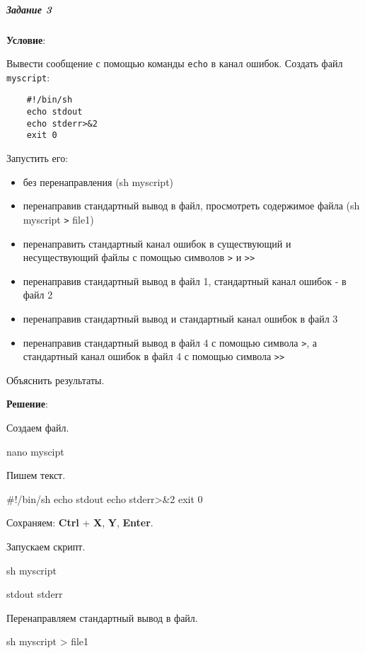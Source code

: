 \subparagraph{Задание 3} \textbf{Условие}:

Вывести сообщение с помощью команды \verb|echo| в канал ошибок.
Создать файл \verb|myscript|:

\begin{verbatim}
    #!/bin/sh
    echo stdout
    echo stderr>&2
    exit 0
\end{verbatim}

Запустить его:
\begin{itemize}
    \item без перенаправления (sh myscript)
    \item перенаправив стандартный вывод в файл, просмотреть содержимое файла (sh myscript \verb|>| file1)
    \item перенаправить стандартный канал ошибок в существующий и несуществующий файлы с помощью символов \verb|>| и \verb|>>|
    \item перенаправив стандартный вывод в файл 1, стандартный канал ошибок - в файл 2
    \item перенаправив стандартный вывод и стандартный канал ошибок в файл 3
    \item перенаправив стандартный вывод в файл 4 с помощью символа \verb|>|, а стандартный канал ошибок в файл 4 с помощью символа \verb|>>|
\end{itemize}

Объяснить результаты.

\textbf{Решение}:

Создаем файл.

\begin{BashBox}
nano myscipt
\end{BashBox}

Пишем текст.

\begin{BashBox}
#!/bin/sh
echo stdout
echo stderr>&2
exit 0
\end{BashBox}

Сохраняем: \textbf{Ctrl} + \textbf{X}, \textbf{Y}, \textbf{Enter}.

Запускаем скрипт.

\begin{BashBox}
sh myscript
\end{BashBox}

\begin{OutBox}
stdout
stderr
\end{OutBox}

Перенаправляем стандартный вывод в файл.

\begin{BashBox}
sh myscript > file1
\end{BashBox}

